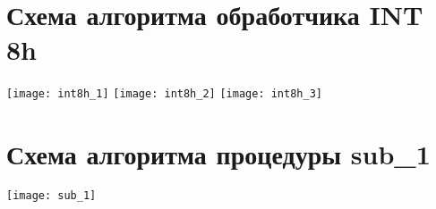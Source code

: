\section*{Схема алгоритма обработчика INT 8h}
\begin{center}
    \texttt{[image: int8h\_1]}
    \clearpage
    \texttt{[image: int8h\_2]}
    \clearpage
    \texttt{[image: int8h\_3]}
\end{center}
\section*{Схема алгоритма процедуры sub\_1}
\begin{center}
    \texttt{[image: sub\_1]}
\end{center}
